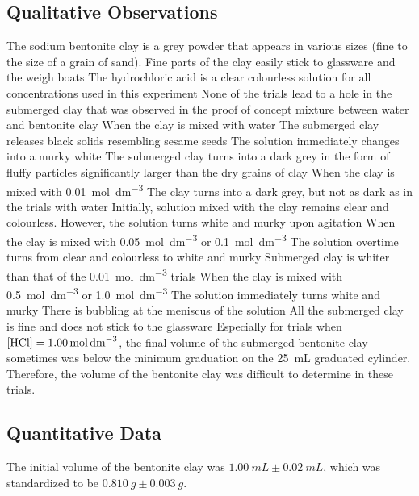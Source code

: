 \documentclass[11pt, letterpaper]{article}
\begin{document}
\subsection{Qualitative Observations}
\begin{outline}
    \1 The sodium bentonite clay is a grey powder that appears in various sizes (fine to the size of a grain of sand). Fine parts of the clay easily stick to glassware and the weigh boats
    \1 The hydrochloric acid is a clear colourless solution for all \ce{[H+]} concentrations used in this experiment
    \1 None of the trials lead to a hole in the submerged clay that was observed in the proof of concept mixture between water and bentonite clay
    \1 When the clay is mixed with water
    \2 The submerged clay releases black solids resembling sesame seeds
    \2 The solution immediately changes into a murky white
    \2 The submerged clay turns into a dark grey in the form of fluffy particles significantly larger than the dry grains of clay
    \1 When the clay is mixed with \SI{0.01}{mol.dm^{-3}} 
    \2 The clay turns into a dark grey, but not as dark as in the trials with water
    \2 Initially, solution mixed with the clay remains clear and colourless. However, the solution turns white and murky upon agitation
    \1 When the clay is mixed with \SI{0.05}{mol.dm^{-3}}  or \SI{0.1}{mol.dm^{-3}} 
    \2 The solution overtime turns from clear and colourless to white and murky
    \2 Submerged clay is whiter than that of the \SI{0.01}{mol.dm^{-3}} trials
    \1 When the clay is mixed with \SI{0.5}{mol.dm^{-3}}  or \SI{1.0}{mol.dm^{-3}} 
    \2 The solution immediately turns white and murky
    \2 There is bubbling at the meniscus of the solution
    \2 All the submerged clay is fine and does not stick to the glassware
    \1 Especially for trials when \(\ce{[HCl]} = \SI{1.00}{mol.dm^{-3}}\), the final volume of the submerged bentonite clay sometimes was below the minimum graduation on the \SI{25}{mL} graduated cylinder. Therefore, the volume of the bentonite clay was difficult to determine in these trials.
\end{outline}

\subsection{Quantitative Data}

The initial volume of the bentonite clay was \(\SI{1.00}{mL} \pm \SI{0.02}{mL}\), which was standardized to be \(\SI{0.810}{g} \pm \SI{0.003}{g}\).
\end{document}
